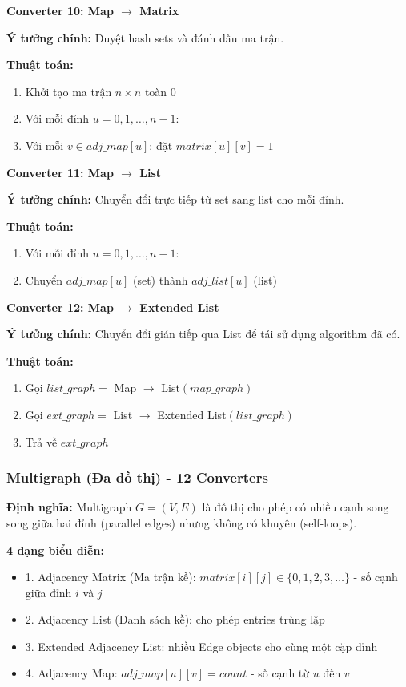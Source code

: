 \documentclass[12pt,a4paper]{article}
\begin{document}
\textbf{Converter 10: Map $\rightarrow$ Matrix}

\textbf{Ý tưởng chính:} Duyệt hash sets và đánh dấu ma trận.

\textbf{Thuật toán:}
\begin{enumerate}
    \item Khởi tạo ma trận $n \times n$ toàn $0$
    \item Với mỗi đỉnh $u = 0, 1, \ldots, n-1$:
    \item Với mỗi $v \in adj\_map[u]$: đặt $matrix[u][v] = 1$
\end{enumerate}
\vspace{0.5cm}

\textbf{Converter 11: Map $\rightarrow$ List}

\textbf{Ý tưởng chính:} Chuyển đổi trực tiếp từ set sang list cho mỗi đỉnh.

\textbf{Thuật toán:}
\begin{enumerate}
    \item Với mỗi đỉnh $u = 0, 1, \ldots, n-1$:
    \item Chuyển $adj\_map[u]$ (set) thành $adj\_list[u]$ (list)
\end{enumerate}
\vspace{0.5cm}

\textbf{Converter 12: Map $\rightarrow$ Extended List}

\textbf{Ý tưởng chính:} Chuyển đổi gián tiếp qua List để tái sử dụng algorithm đã có.

\textbf{Thuật toán:}
\begin{enumerate}
    \item Gọi $list\_graph = $ Map $\rightarrow$ List$(map\_graph)$
    \item Gọi $ext\_graph = $ List $\rightarrow$ Extended List$(list\_graph)$
    \item Trả về $ext\_graph$
\end{enumerate}

\subsubsection{Multigraph (Đa đồ thị) - 12 Converters}

\textbf{Định nghĩa:} Multigraph $G = (V, E)$ là đồ thị cho phép có nhiều cạnh song song giữa hai đỉnh (parallel edges) nhưng không có khuyên (self-loops).
\vspace{0.5cm}

\textbf{4 dạng biểu diễn:}
\begin{itemize}[label=\textbullet]
    \item 1. Adjacency Matrix (Ma trận kề): $matrix[i][j] \in \{0, 1, 2, 3, \ldots\}$ - số cạnh giữa đỉnh $i$ và $j$
    \item 2. Adjacency List (Danh sách kề): cho phép entries trùng lặp
    \item 3. Extended Adjacency List: nhiều Edge objects cho cùng một cặp đỉnh
    \item 4. Adjacency Map: $adj\_map[u][v] = count$ - số cạnh từ $u$ đến $v$
\end{itemize}
\end{document}
